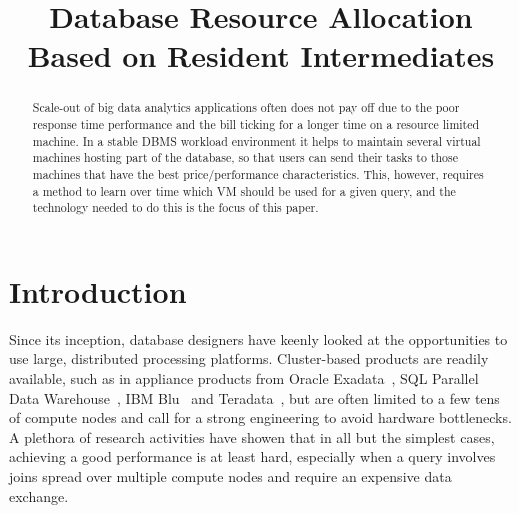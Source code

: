 \documentclass[conference]{IEEEtran}
\begin{document}
\title{Database Resource Allocation Based on Resident Intermediates}

\author{
}

\maketitle

\begin{abstract} 
Scale-out of big data analytics applications often does not pay off due to the poor response time performance and the bill ticking for a longer time on a resource limited machine.
In a stable DBMS workload environment it helps to maintain several virtual machines hosting part of the database, so that users can send their tasks to those machines that have the best price/performance characteristics.
This, however, requires a method to learn over time which VM should be used for a given query, and the technology needed to do this is the focus of this paper.
\end{abstract} 

\section{Introduction}
\label{Introduction} 
Since its inception, database designers have keenly looked at the opportunities to use large, distributed processing platforms. Cluster-based products are readily available, such as in appliance products from Oracle Exadata~\cite{Exadata}, SQL Parallel Data Warehouse~\cite{SQLParallel}, IBM Blu~\cite{IBMBlu} and Teradata~\cite{Teradata}, but are often limited to a few tens of compute nodes and call for a strong engineering to avoid hardware bottlenecks.
A plethora of research activities have showen that in all but the simplest cases, achieving a good performance is at least  hard, especially when a query involves joins spread over multiple compute nodes and require an expensive data exchange. 
\end{document}
